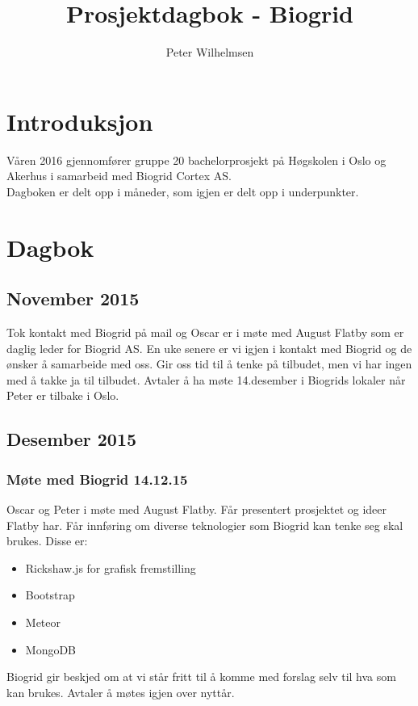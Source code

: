 \documentclass[12pt, oneside]{article}
\title{Prosjektdagbok - Biogrid}
\author{Peter Wilhelmsen}
\begin{document}
\maketitle
\pagebreak
\tableofcontents
\pagebreak

\section{Introduksjon}
Våren 2016 gjennomfører gruppe 20 bachelorprosjekt på Høgskolen i Oslo og Akerhus i samarbeid med Biogrid Cortex AS. \\
Dagboken er delt opp i måneder, som igjen er delt opp i underpunkter. 

\section{Dagbok}


\subsection{November 2015}
Tok kontakt med Biogrid på mail og Oscar er i møte med August Flatby som er daglig leder for Biogrid AS.
En uke senere er vi igjen i kontakt med Biogrid og de ønsker å samarbeide med oss. Gir oss tid til å tenke på tilbudet, men vi har ingen med å takke ja til tilbudet. Avtaler å ha møte 14.desember i Biogrids lokaler når Peter er tilbake i Oslo.


\subsection{Desember 2015}

\subsubsection{ Møte med Biogrid 14.12.15}
Oscar og Peter i møte med August Flatby. Får presentert prosjektet og ideer Flatby har. Får innføring om diverse teknologier som Biogrid kan tenke seg skal brukes. Disse er:  
\begin{itemize}
	\item Rickshaw.js for grafisk fremstilling
	\item Bootstrap
	\item Meteor
	\item MongoDB
\end{itemize}
Biogrid gir beskjed om at vi står fritt til å komme med forslag selv til hva som kan brukes. Avtaler å møtes igjen over nyttår.
\end{document}
